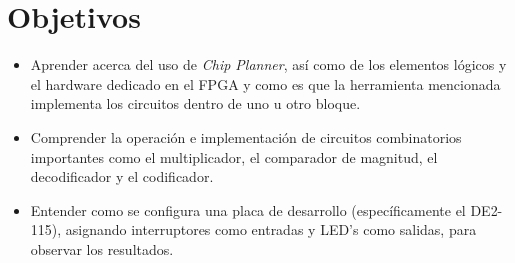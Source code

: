 \section{Objetivos \label{sec:obj}}


\begin{itemize} 
	\item Aprender acerca del uso de \textit{Chip Planner}, así como de los elementos lógicos y el hardware dedicado en el FPGA y como es que la herramienta mencionada implementa los circuitos dentro de uno u otro bloque.
	
	\item Comprender la operación e implementación de circuitos combinatorios importantes como el multiplicador, el comparador de magnitud, el decodificador y el codificador.
	
	\item Entender como se configura una placa de desarrollo (específicamente el DE2-115), asignando interruptores como entradas y LED's como salidas, para observar los resultados.
\end{itemize}